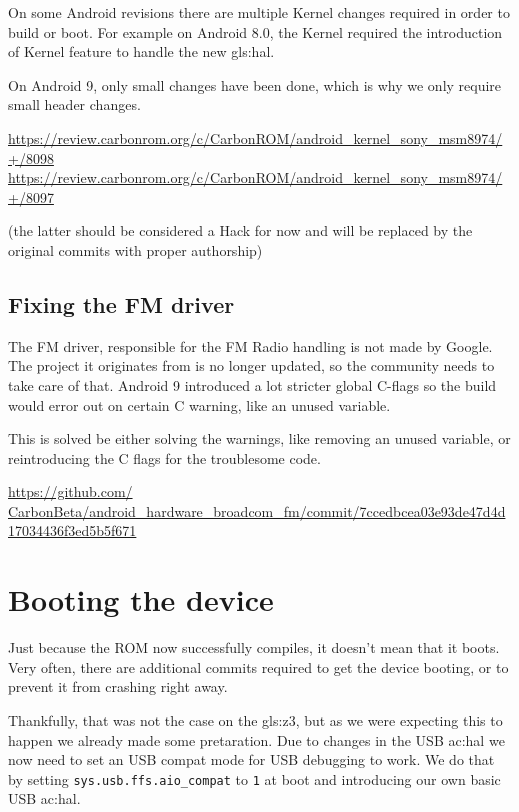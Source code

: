 On some Android revisions there are multiple Kernel changes required in order to build or boot. For example on Android 8.0, the Kernel required the introduction of Kernel feature to handle the new \gls{gls:hal}.

On Android 9, only small changes have been done, which is why we only require small header changes.

\url{https://review.carbonrom.org/c/CarbonROM/android_kernel_sony_msm8974/+/8098}\\
\url{https://review.carbonrom.org/c/CarbonROM/android_kernel_sony_msm8974/+/8097}

(the latter should be considered a Hack for now and will be replaced by the original commits with proper authorship)

\subsection{Fixing the FM driver}
\label{sub:fixing_fm}

The FM driver, responsible for the FM Radio handling is not made by Google. The project it originates from is no longer updated, so the community needs to take care of that.
Android 9 introduced a lot stricter global C-flags so the build would error out on certain C warning, like an unused variable.

This is solved be either solving the warnings, like removing an unused variable, or reintroducing the C flags for the troublesome code.

\href{https://github.com/CarbonBeta/android_hardware_broadcom_fm/commit/7ccedbcea03e93de47d4d17034436f3ed5b5f671}{https://github.com/\\CarbonBeta/android\_hardware\_broadcom\_fm/commit/7ccedbcea03e93de47d4d17034436f3ed5b5f671}

\section{Booting the device}
\label{ch:BootingTheDevice}
Just because the ROM now successfully compiles, it doesn't mean that it boots. Very often, there are additional commits required to get the device booting, or to prevent it from crashing right away.

Thankfully, that was not the case on the \gls{gls:z3}, but as we were expecting this to happen we already made some pretaration.
Due to changes in the USB \acrshort{ac:hal} we now need to set an USB compat mode for USB debugging to work.
We do that by setting \texttt{sys.usb.ffs.aio\_compat} to \texttt{1} at boot and introducing our own basic USB \acrshort{ac:hal}.

